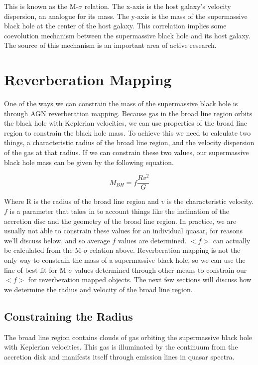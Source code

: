\documentclass[]{article}
\begin{document}
This is known as the M-\(\sigma\) relation. The x-axis is the host
galaxy's velocity dispersion, an analogue for its mass. The y-axis is
the mass of the supermassive black hole at the center of the host
galaxy. This correlation implies some coevolution mechanism between the
supermassive black hole and its host galaxy. The source of this
mechanism is an important area of active research.

\hypertarget{reverberation-mapping}{%
\section{Reverberation Mapping}\label{reverberation-mapping}}

One of the ways we can constrain the mass of the supermassive black hole
is through AGN reverberation mapping. Because gas in the broad line
region orbits the black hole with Keplerian velocities, we can use
properties of the broad line region to constrain the black hole mass. To
achieve this we need to calculate two things, a characteristic radius of
the broad line region, and the velocity dispersion of the gas at that
radius. If we can constrain these two values, our supermassive black
hole mass can be given by the following equation.

\[M_{BH}=f\frac{Rv^2}{G}\]

Where R is the radius of the broad line region and \(v\) is the
characteristic velocity. \(f\) is a parameter that takes in to account
things like the inclination of the accretion disc and the geometry of
the broad line region. In practice, we are usually not able to constrain
these values for an individual quasar, for reasons we'll discuss below,
and so average \(f\) values are determined. \(<f>\) can actually be
calculated from the M-\(\sigma\) relation above. Reverberation mapping
is not the only way to constrain the mass of a supermassive black hole,
so we can use the line of best fit for M-\(\sigma\) values determined
through other means to constrain our \(<f>\) for reverberation mapped
objects. The next few sections will discuss how we determine the radius
and velocity of the broad line region.

\hypertarget{constraining-the-radius}{%
\subsection{Constraining the Radius}\label{constraining-the-radius}}

The broad line region contains clouds of gas orbiting the supermassive
black hole with Keplerian velocities. This gas is illuminated by the
continuum from the accretion disk and manifests itself through emission
lines in quasar spectra.
\end{document}
